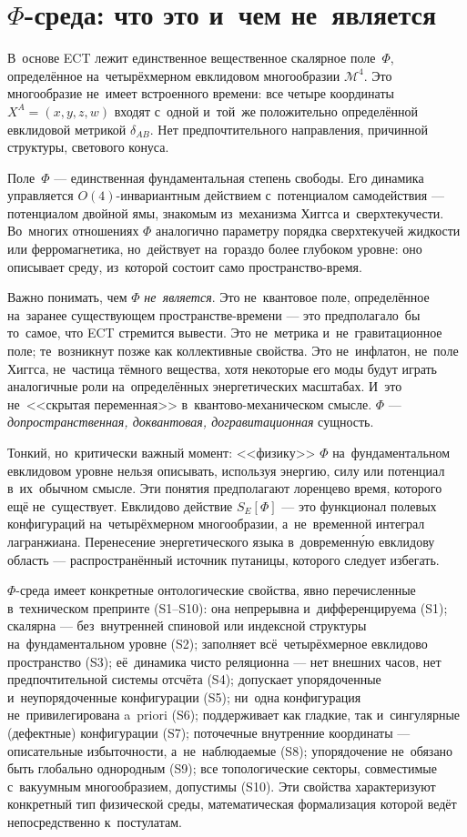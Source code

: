 \documentclass[11pt,a4paper]{article}
\begin{document}
\section{$\Phi$-среда: что это и~чем не~является}
\label{sec:pop_medium}

В~основе ECT лежит единственное вещественное скалярное поле~$\Phi$, определённое на~четырёхмерном евклидовом многообразии $\mathcal{M}^4$. Это многообразие не~имеет встроенного времени: все четыре координаты $X^A = (x, y, z, w)$ входят с~одной и~той~же положительно определённой евклидовой метрикой $\delta_{AB}$. Нет предпочтительного направления, причинной структуры, светового конуса.

Поле~$\Phi$ --- единственная фундаментальная степень свободы. Его динамика управляется $O(4)$-инвариантным действием с~потенциалом самодействия --- потенциалом двойной ямы, знакомым из~механизма Хиггса и~сверхтекучести. Во~многих отношениях $\Phi$ аналогично параметру порядка сверхтекучей жидкости или ферромагнетика, но~действует на~гораздо более глубоком уровне: оно описывает среду, из~которой состоит само пространство-время.

Важно понимать, чем $\Phi$ \emph{не~является}. Это не~квантовое поле, определённое на~заранее существующем пространстве-времени --- это предполагало~бы то~самое, что ECT стремится вывести. Это не~метрика и~не~гравитационное поле; те~возникнут позже как коллективные свойства. Это не~инфлатон, не~поле Хиггса, не~частица тёмного вещества, хотя некоторые его моды будут играть аналогичные роли на~определённых энергетических масштабах. И~это не~<<скрытая переменная>> в~квантово-механическом смысле. $\Phi$ --- \emph{допространственная, доквантовая, догравитационная} сущность.

Тонкий, но~критически важный момент: <<физику>> $\Phi$ на~фундаментальном евклидовом уровне нельзя описывать, используя энергию, силу или потенциал в~их~обычном смысле. Эти понятия предполагают лоренцево время, которого ещё не~существует. Евклидово действие $S_E[\Phi]$ --- это функционал полевых конфигураций на~четырёхмерном многообразии, а~не~временной интеграл лагранжиана. Перенесение энергетического языка в~довременну́ю евклидову область --- распространённый источник путаницы, которого следует избегать.

$\Phi$-среда имеет конкретные онтологические свойства, явно перечисленные в~техническом препринте (S1--S10): она непрерывна и~дифференцируема (S1); скалярна --- без~внутренней спиновой или индексной структуры на~фундаментальном уровне (S2); заполняет всё~четырёхмерное евклидово пространство (S3); её~динамика чисто реляционна --- нет внешних часов, нет предпочтительной системы отсчёта (S4); допускает упорядоченные и~неупорядоченные конфигурации (S5); ни~одна конфигурация не~привилегирована a~priori (S6); поддерживает как гладкие, так и~сингулярные (дефектные) конфигурации (S7); поточечные внутренние координаты --- описательные избыточности, а~не~наблюдаемые (S8); упорядочение не~обязано быть глобально однородным (S9); все топологические секторы, совместимые с~вакуумным многообразием, допустимы (S10). Эти свойства характеризуют конкретный тип физической среды, математическая формализация которой ведёт непосредственно к~постулатам.
\end{document}
